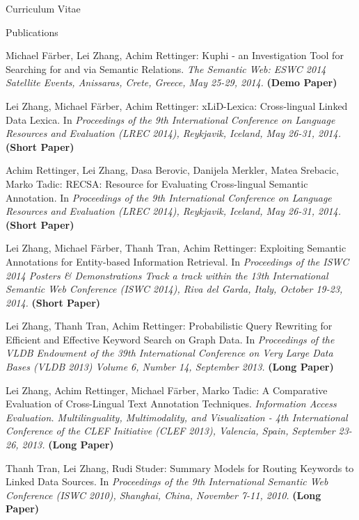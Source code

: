 \begin{cv}{\centerline{\LARGE Curriculum Vitae}}
\begin{cvlist}{Publications}
\begin{list}{}{\leftmargin=-1em}
    \item Michael Färber, Lei Zhang, Achim Rettinger: Kuphi - an Investigation Tool for Searching for and via Semantic Relations. \emph{The Semantic Web: ESWC 2014 Satellite Events, Anissaras, Crete, Greece, May 25-29, 2014.}
    \textbf{(Demo Paper)}
    
    \item Lei Zhang, Michael Färber, Achim Rettinger: xLiD-Lexica: Cross-lingual Linked Data Lexica. In \emph{Proceedings of the 9th International Conference on Language Resources and Evaluation (LREC 2014), Reykjavik, Iceland, May 26-31, 2014.}
    \textbf{(Short Paper)}
    
    \item 	Achim Rettinger, Lei Zhang, Dasa Berovic, Danijela Merkler, Matea Srebacic, Marko Tadic: RECSA: Resource for Evaluating Cross-lingual Semantic Annotation. In \emph{Proceedings of the 9th International Conference on Language Resources and Evaluation (LREC 2014), Reykjavik, Iceland, May 26-31, 2014.}
    \textbf{(Short Paper)}
    
    \item Lei Zhang, Michael Färber, Thanh Tran, Achim Rettinger: Exploiting Semantic Annotations for Entity-based Information Retrieval. In \emph{Proceedings of the ISWC 2014 Posters \& Demonstrations Track a track within the 13th International Semantic Web Conference (ISWC 2014), Riva del Garda, Italy, October 19-23, 2014.}
    \textbf{(Short Paper)}
    
    \item Lei Zhang, Thanh Tran, Achim Rettinger: Probabilistic Query Rewriting for Efficient and Effective Keyword Search on Graph Data. In \emph{Proceedings of the VLDB Endowment of the 39th International Conference on Very Large Data Bases (VLDB 2013) Volume 6, Number 14, September 2013.}
    \textbf{(Long Paper)}
    
    \item Lei Zhang, Achim Rettinger, Michael Färber, Marko Tadic: A Comparative Evaluation of Cross-Lingual Text Annotation Techniques. \emph{Information Access Evaluation. Multilinguality, Multimodality, and Visualization - 4th International Conference of the CLEF Initiative (CLEF 2013), Valencia, Spain, September 23-26, 2013.}
    \textbf{(Long Paper)}
    
    \item Thanh Tran, Lei Zhang, Rudi Studer: Summary Models for Routing Keywords to Linked Data Sources. In \emph{Proceedings of the 9th International Semantic Web Conference (ISWC 2010), Shanghai, China, November 7-11, 2010.}
    \textbf{(Long Paper)}
    

\end{list}
\end{cvlist}
\end{cv}
